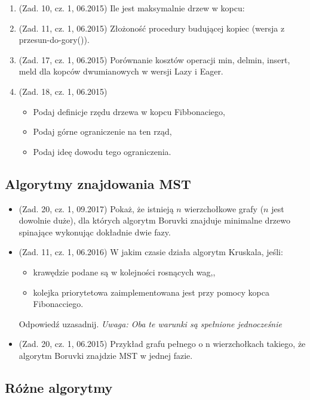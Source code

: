 \documentclass[10pt]{article}%
\begin{document}
\begin{enumerate}
\item (Zad. 10, cz. 1, 06.2015) Ile jest maksymalnie drzew w kopcu:

\item (Zad. 11, cz. 1, 06.2015) Złożoność procedury budującej kopiec (wersja z przesun-do-gory()).

\item (Zad. 17, cz. 1, 06.2015) Porównanie kosztów operacji { min, delmin, insert, meld } dla kopców dwumianowych w wersji Lazy i Eager.

\item (Zad. 18, cz. 1, 06.2015) 
\begin{itemize}
	\item Podaj definicje rzędu drzewa w kopcu Fibbonaciego, 
	\item Podaj górne ograniczenie na ten rząd, 
	\item Podaj ideę dowodu tego ograniczenia. 
\end{itemize}

\end{enumerate}


\subsection{Algorytmy znajdowania MST}
\begin{itemize}

\item (Zad. 20, cz. 1, 09.2017) Pokaż, że istnieją $n$ wierzchołkowe grafy ($n$ jest dowolnie duże), dla których algorytm Boruvki znajduje minimalne drzewo spinające wykonując dokładnie dwie fazy.

\item (Zad. 11, cz. 1, 06.2016) W jakim czasie działa algorytm Kruskala, jeśli:
\begin{itemize}
	\item krawędzie podane są w kolejności rosnących wag,,
	\item kolejka priorytetowa zaimplementowana jest przy pomocy kopca Fibonacciego.
\end{itemize}
Odpowiedź uzasadnij. \textit{Uwaga: Oba te warunki są spełnione jednocześnie}

\item (Zad. 20, cz. 1, 06.2015) Przykład grafu pełnego o n wierzchołkach takiego, że algorytm Boruvki znajdzie MST w jednej fazie.

\end{itemize}


\subsection{Różne algorytmy}
\end{document}
